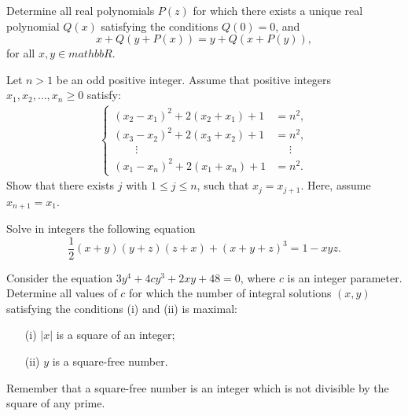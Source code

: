 \begin{question}[name={1993 Austrian--Polish}]
    Determine all real polynomials $P(z)$ for which there exists a unique real polynomial $Q(x)$ satisfying the conditions $Q(0)= 0$, and \[x + Q(y + P(x))= y + Q(x + P(y)),\] for all $x,y \in mathbb R$.
\end{question}




\begin{question}[name={1994 Austrian--Polish}]
    Let $n > 1$ be an odd positive integer. Assume that positive integers $x_1, x_2,\dots, x_n \ge 0$ satisfy:
    \begin{align*}
        \begin{cases}
            (x_2 - x_1)^2 + 2(x_2 +x_1) + 1 &= n^2,\\
            (x_3 -x_2)^2 + 2(x_3 +x_2) + 1 &= n^2,\\
            \qquad \vdots &\phantom{=} \vdots\\
            (x_1 - x_n)^2 + 2(x_1 + x_n)+ 1 &= n^2.
        \end{cases}
    \end{align*}
    Show that there exists $j$ with $1 \le j \le n$, such that $x_j = x_{j+1}$. Here, assume $x_{n+1} = x_1$.
\end{question}




\begin{question}[name={1994 Austrian--Polish}]
    Solve in integers the following equation
    \[\frac{1}{2}(x + y)(y + z)(z + x) + (x + y + z)^3 = 1 - xyz.\]
\end{question}




\begin{question}[name={1995 Austrian--Polish}]
    Consider the equation $3y^4 + 4cy^3 + 2xy + 48 = 0$, where $c$ is an integer parameter. Determine all values of $c$ for which the number of integral solutions $(x,y)$ satisfying the conditions (i) and (ii) is maximal:
    \begin{itemize}
        \item[(i)] $|x|$ is a square of an integer;
        \item[(ii)] $y$ is a square-free number.
    \end{itemize}
    Remember that a square-free number is an integer which is not divisible by the square of any prime.
\end{question}




